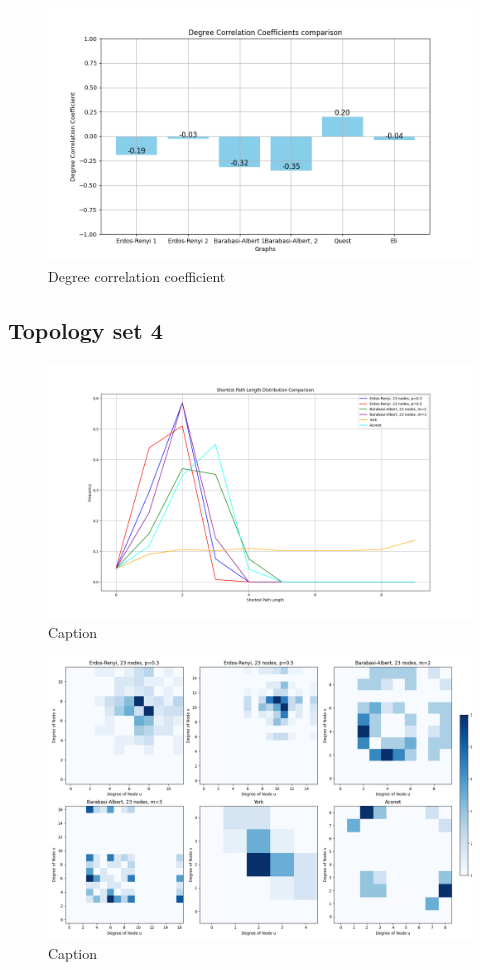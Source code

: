 \begin{figure}
    \centering
    \includegraphics[width=0.9\linewidth]{images/FINAL-TOPO-COMP/Degree-correlation-coeff/deg-coeff-20.png}
    \caption{Degree correlation coefficient}
    \label{fig:enter-label}
\end{figure}

\subsection{Topology set 4}
\begin{figure}
    \centering
    \includegraphics[width=0.9\linewidth]{images/FINAL-TOPO-COMP/line-23.png}
    \caption{Caption}
    \label{fig:enter-label}
\end{figure}

\begin{figure}
    \centering
    \includegraphics[width=0.9\linewidth]{images/FINAL-TOPO-COMP/Degree-correlation-matrices/23-matrix.png}
    \caption{Caption}
    \label{fig:enter-label}
\end{figure}

